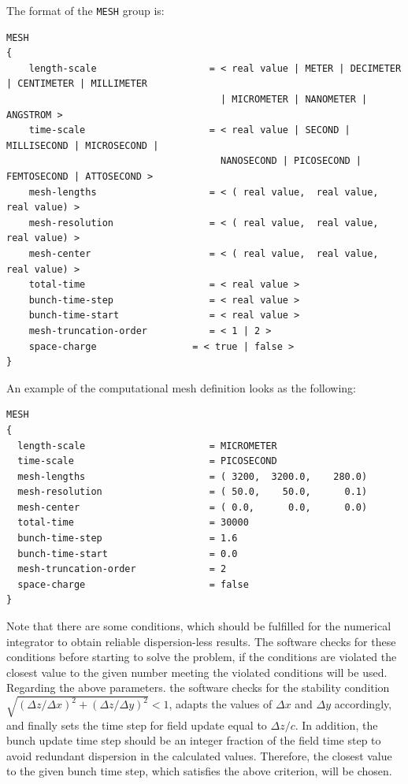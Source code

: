The format of the \texttt{MESH} group is:
\begin{Verbatim}[frame=single,fontsize=\small,tabsize=4]
MESH
{
	length-scale                    = < real value | METER | DECIMETER | CENTIMETER | MILLIMETER
									  | MICROMETER | NANOMETER | ANGSTROM >
	time-scale                      = < real value | SECOND | MILLISECOND | MICROSECOND |
									  NANOSECOND | PICOSECOND | FEMTOSECOND | ATTOSECOND >
	mesh-lengths                    = < ( real value,  real value, real value) >
	mesh-resolution                 = < ( real value,  real value, real value) >
	mesh-center                     = < ( real value,  real value, real value) >
	total-time                      = < real value >
	bunch-time-step                 = < real value >
	bunch-time-start                = < real value >
	mesh-truncation-order           = < 1 | 2 >
    space-charge           	     = < true | false >
}
\end{Verbatim}
An example of the computational mesh definition looks as the following:
\begin{snugshade}
\begin{Verbatim}[fontsize=\small, tabsize = 4]
MESH
{
  length-scale                      = MICROMETER
  time-scale                        = PICOSECOND
  mesh-lengths                      = ( 3200,  3200.0,    280.0)
  mesh-resolution                   = ( 50.0,    50.0,      0.1)
  mesh-center                       = ( 0.0,      0.0,      0.0)
  total-time                        = 30000
  bunch-time-step                   = 1.6
  bunch-time-start                  = 0.0
  mesh-truncation-order             = 2
  space-charge                      = false
}
\end{Verbatim}
\end{snugshade}
%
Note that there are some conditions, which should be fulfilled for the numerical integrator to obtain reliable dispersion-less results.
%
The software checks for these conditions before starting to solve the problem, if the conditions are violated the closest value to the given number meeting the violated conditions will be used.
%
Regarding the above parameters. the software checks for the stability condition $\sqrt{(\Delta z/\Delta x)^2+ (\Delta z/\Delta y)^2} < 1$, adapts the values of $\Delta x$ and $\Delta y$ accordingly, and finally sets the time step for field update equal to $\Delta z / c$.
%
In addition, the bunch update time step should be an integer fraction of the field time step to avoid redundant dispersion in the calculated values.
%
Therefore, the closest value to the given bunch time step, which satisfies the above criterion, will be chosen.

